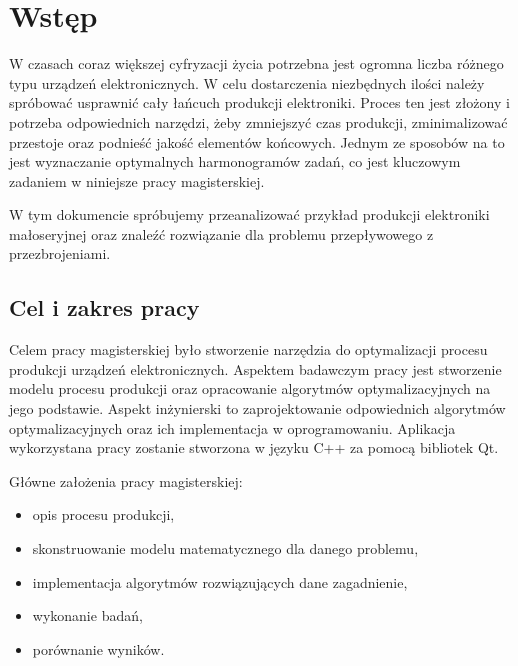 \chapter{Wstęp}

W czasach coraz większej cyfryzacji życia potrzebna jest ogromna liczba różnego typu urządzeń elektronicznych.
W celu dostarczenia niezbędnych ilości należy spróbować usprawnić cały łańcuch produkcji elektroniki. Proces ten jest złożony i potrzeba odpowiednich narzędzi, żeby zmniejszyć czas produkcji, zminimalizować przestoje oraz podnieść jakość elementów końcowych. Jednym ze sposobów na to jest wyznaczanie optymalnych harmonogramów zadań, co jest kluczowym zadaniem w niniejsze pracy magisterskiej.

W tym dokumencie spróbujemy przeanalizować przykład produkcji elektroniki małoseryjnej oraz znaleźć rozwiązanie dla problemu przepływowego z przezbrojeniami.

\section{Cel i zakres pracy}
Celem pracy magisterskiej było stworzenie narzędzia do optymalizacji procesu produkcji urządzeń elektronicznych.
Aspektem badawczym pracy jest stworzenie modelu procesu produkcji oraz opracowanie algorytmów optymalizacyjnych na jego podstawie.
Aspekt inżynierski to zaprojektowanie odpowiednich algorytmów optymalizacyjnych oraz ich implementacja w oprogramowaniu. Aplikacja wykorzystana pracy zostanie stworzona w języku C++ za pomocą bibliotek Qt.

\breakparagraph{}
Główne założenia pracy magisterskiej:
\begin{itemize}
	\item opis procesu produkcji,
	\item skonstruowanie modelu matematycznego dla danego problemu,
	\item implementacja algorytmów rozwiązujących dane zagadnienie,
	\item wykonanie badań,
	\item porównanie wyników.
\end{itemize}
